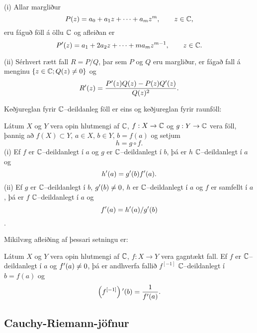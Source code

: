 \begin{sy} (i) Allar margliður
 $$P(z)= a_0+a_1z+\cdots+a_mz^m, \qquad z\in {\mathbb C},
 $$
eru fáguð föll á öllu ${\mathbb C}$ og afleiðan er
 $$P{\sp{\prime}}(z)= a_1+2a_2z+\cdots+ma_mz^{m-1}, \qquad z\in {\mathbb C}.
 $$

(ii) Sérhvert rætt fall $R=P/Q$, þar sem $P$ og $Q$ eru margliður, er
fágað fall á menginu ${\{z\in {\mathbb C}; Q(z)\neq 0\}}$
og
 $$R{\sp{\prime}}(z)= \dfrac{P{\sp{\prime}}(z)Q(z)-P(z)Q{\sp{\prime}}(z)}{Q(z)^2}.
 $$
\end{sy}


Keðjureglan fyrir ${\mathbb C}$--deildanleg
föll er  eins og keðjureglan fyrir  raunföll:

\begin{se}\label{se:2.2.6}  Látum $X$ og $Y$ vera opin hlutmengi af ${\mathbb C}$, $f:X\to {\mathbb C}$ og
$g:Y\to {\mathbb C}$ vera föll, þannig að $f(X)\subset Y$, $a\in X$, $b\in Y$,
$b=f(a)$ og setjum
$$h=g\circ f.
$$ 
(i) Ef $f$ er ${\mathbb C}$--deildanlegt í $a$ og $g$ er ${\mathbb C}$--deildanlegt í
$b$, þá er $h$ ${\mathbb C}$--deildanlegt í $a$ og
 $$h{\sp{\prime}}(a)=g{\sp{\prime}}(b)f{\sp{\prime}}(a).
 $$
(ii) Ef $g$ er ${\mathbb C}$--deildanlegt í $b$, $g{\sp{\prime}}(b)\neq 0$, $h$ er
${\mathbb C}$--deildanlegt í $a$ og $f$ er samfellt í $a$, 
þá er $f$ ${\mathbb C}$--deildanlegt í $a$ og 
$$ f{\sp{\prime}}(a)=h{\sp{\prime}}(a)/g{\sp{\prime}}(b)$$.
 
\end{se}

Mikilvæg afleiðing af þessari setningu er:

\begin{fs}\label{fs:2.2.7}  
Látum $X$ og $Y$ vera opin hlutmengi af ${\mathbb C}$, $f:X\to Y$ 
vera gagntækt fall.  Ef $f$ er ${\mathbb C}$--deildanlegt í $a$ og
$f{\sp{\prime}}(a)\neq 0$, þá er andhverfa fallið 
$f^{[-1]}$ ${\mathbb C}$--deildanlegt í $b=f(a)$ og
 \begin{equation*}\left(f^{[-1]}\right){\sp{\prime}}(b)= \dfrac 1{f{\sp{\prime}}(a)}.\label{4.2.4}
 \end{equation*}
\end{fs}



\subsection*{Cauchy-Riemann-jöfnur}

